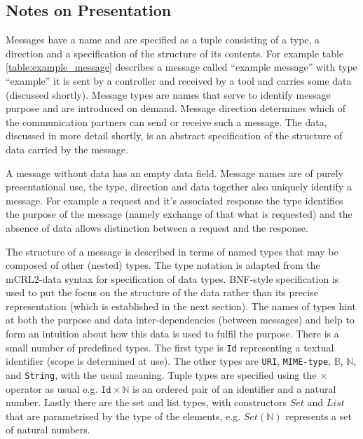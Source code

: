 \documentclass{article}
\begin{document}
  \subsection{Notes on Presentation}

   Messages have a name and are specified as a tuple consisting of a type, a
   direction and a specification of the structure of its contents. For example
   table \ref{table:example_message} describes a message called ``example
   message'' with type ``example'' it is sent by a controller and received by a
   tool and carries some data (discussed shortly). Message types are names that
   serve to identify message purpose and are introduced on demand.  Message
   direction determines which of the communication partners can send or receive
   such a message. The data, discussed in more detail shortly, is an abstract
   specification of the structure of data carried by the message.
   
   A message without data has an empty data field. Message names are of purely
   presentational use, the type, direction and data together also uniquely
   identify a message. For example a request and it's associated response the
   type identifies the purpose of the message (namely exchange of that what is
   requested) and the absence of data allows distinction between a request and
   the response.
   
   The structure of a message is described in terms of named types that may be
   composed of other (nested) types. The type notation is adapted from the
   mCRL2-data syntax for specification of data types. BNF-style specification
   is used to put the focus on the structure of the data rather than its
   precise representation (which is established in the next section).  The
   names of types hint at both the purpose and data inter-dependencies (between
   messages) and help to form an intuition about how this data is used to
   fulfil the purpose.  There is a small number of predefined types. The first
   type is \texttt{Id} representing a textual identifier (scope is determined
   at use).  The other types are \texttt{URI}, \texttt{MIME-type},
   $\mathbb{B}$, $\mathbb{N}$, and \texttt{String}, with the usual meaning.
   Tuple types are specified using the $\times$ operator as usual e.g.
   $\texttt{Id} \times \mathbb{N}$ is an ordered pair of an identifier and a
   natural number.  Lastly there are the set and list types, with constructors
   $Set$ and $List$ that are parametrised by the type of the elements, e.g.
   $Set(\mathbb{N})$ represents a set of natural numbers.
   
\end{document}

